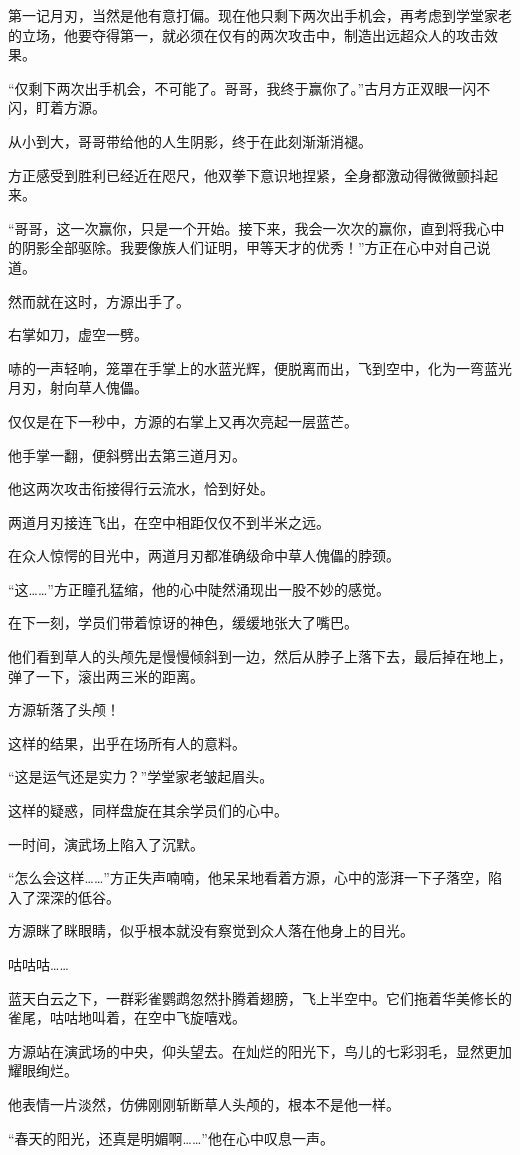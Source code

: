 \begin{this_body}
第一记月刃，当然是他有意打偏。现在他只剩下两次出手机会，再考虑到学堂家老的立场，他要夺得第一，就必须在仅有的两次攻击中，制造出远超众人的攻击效果。

“仅剩下两次出手机会，不可能了。哥哥，我终于赢你了。”古月方正双眼一闪不闪，盯着方源。

从小到大，哥哥带给他的人生阴影，终于在此刻渐渐消褪。

方正感受到胜利已经近在咫尺，他双拳下意识地捏紧，全身都激动得微微颤抖起来。

“哥哥，这一次赢你，只是一个开始。接下来，我会一次次的赢你，直到将我心中的阴影全部驱除。我要像族人们证明，甲等天才的优秀！”方正在心中对自己说道。

然而就在这时，方源出手了。

右掌如刀，虚空一劈。

哧的一声轻响，笼罩在手掌上的水蓝光辉，便脱离而出，飞到空中，化为一弯蓝光月刃，射向草人傀儡。

仅仅是在下一秒中，方源的右掌上又再次亮起一层蓝芒。

他手掌一翻，便斜劈出去第三道月刃。

他这两次攻击衔接得行云流水，恰到好处。

两道月刃接连飞出，在空中相距仅仅不到半米之远。

在众人惊愕的目光中，两道月刃都准确级命中草人傀儡的脖颈。

“这……”方正瞳孔猛缩，他的心中陡然涌现出一股不妙的感觉。

在下一刻，学员们带着惊讶的神色，缓缓地张大了嘴巴。

他们看到草人的头颅先是慢慢倾斜到一边，然后从脖子上落下去，最后掉在地上，弹了一下，滚出两三米的距离。

方源斩落了头颅！

这样的结果，出乎在场所有人的意料。

“这是运气还是实力？”学堂家老皱起眉头。

这样的疑惑，同样盘旋在其余学员们的心中。

一时间，演武场上陷入了沉默。

“怎么会这样……”方正失声喃喃，他呆呆地看着方源，心中的澎湃一下子落空，陷入了深深的低谷。

方源眯了眯眼睛，似乎根本就没有察觉到众人落在他身上的目光。

咕咕咕……

蓝天白云之下，一群彩雀鹦鹉忽然扑腾着翅膀，飞上半空中。它们拖着华美修长的雀尾，咕咕地叫着，在空中飞旋嘻戏。

方源站在演武场的中央，仰头望去。在灿烂的阳光下，鸟儿的七彩羽毛，显然更加耀眼绚烂。

他表情一片淡然，仿佛刚刚斩断草人头颅的，根本不是他一样。

“春天的阳光，还真是明媚啊……”他在心中叹息一声。

\end{this_body}

